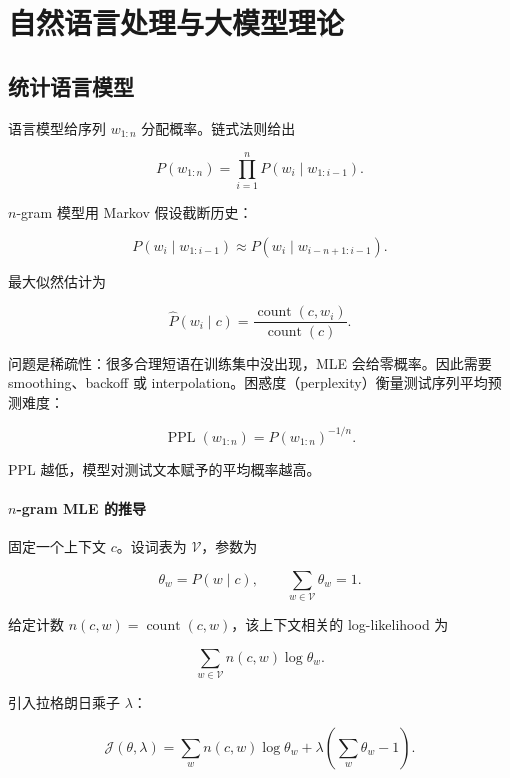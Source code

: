 \section{自然语言处理与大模型理论}


\subsection{统计语言模型}


语言模型给序列 \(w_{1:n}\) 分配概率。链式法则给出

\[
  P(w_{1:n})
  =
  \prod_{i=1}^{n}P(w_i\mid w_{1:i-1}).
\]

\(n\)-gram 模型用 Markov 假设截断历史：

\[
  P(w_i\mid w_{1:i-1})
  \approx
  P(w_i\mid w_{i-n+1:i-1}).
\]

最大似然估计为

\[
  \widehat P(w_i\mid c)
  =
  \frac{\operatorname{count}(c,w_i)}
  {\operatorname{count}(c)}.
\]

问题是稀疏性：很多合理短语在训练集中没出现，MLE 会给零概率。因此需要 smoothing、backoff 或 interpolation。困惑度（perplexity）衡量测试序列平均预测难度：

\[
  \operatorname{PPL}(w_{1:n})
  =
  P(w_{1:n})^{-1/n}.
\]

PPL 越低，模型对测试文本赋予的平均概率越高。

\paragraph{\(n\)-gram MLE 的推导}

固定一个上下文 \(c\)。设词表为 \(\mathcal{V}\)，参数为

\[
  \theta_w=P(w\mid c),
  \qquad
  \sum_{w\in\mathcal{V}}\theta_w=1.
\]

给定计数 \(n(c,w)=\operatorname{count}(c,w)\)，该上下文相关的 log-likelihood 为

\[
  \sum_{w\in\mathcal{V}}
  n(c,w)\log\theta_w.
\]

引入拉格朗日乘子 \(\lambda\)：

\[
  \mathcal{J}(\theta,\lambda)
  =
  \sum_w n(c,w)\log\theta_w
  +
  \lambda\left(\sum_w\theta_w-1\right).
\]

